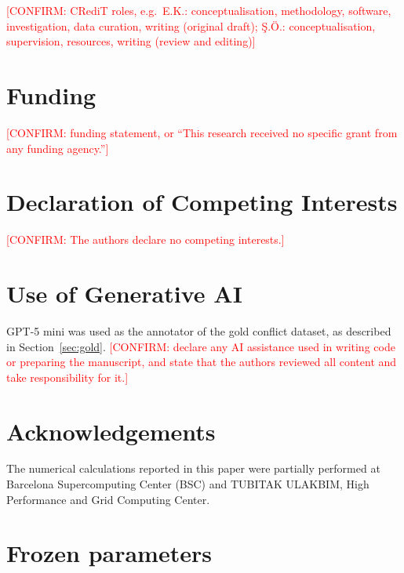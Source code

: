 \documentclass[11pt]{article}
\newcommand{\confirm}[1]{\textcolor{red}{[CONFIRM: #1]}} %
\begin{document}
\confirm{CRediT roles, e.g.\ E.K.: conceptualisation, methodology, software, investigation, data curation, writing (original draft); \c{S}.\"O.: conceptualisation, supervision, resources, writing (review and editing)}

\section*{Funding}

\confirm{funding statement, or ``This research received no specific grant from any funding agency.''}

\section*{Declaration of Competing Interests}

\confirm{The authors declare no competing interests.}

\section*{Use of Generative AI}

GPT-5 mini was used as the annotator of the gold conflict dataset, as described in Section~\ref{sec:gold}. \confirm{declare any AI assistance used in writing code or preparing the manuscript, and state that the authors reviewed all content and take responsibility for it.}

\section*{Acknowledgements}

The numerical calculations reported in this paper were partially performed at Barcelona Supercomputing Center (BSC) and TUBITAK ULAKBIM, High Performance and Grid Computing Center.

\appendix

\section{Frozen parameters}
\label{app:params}
\end{document}
